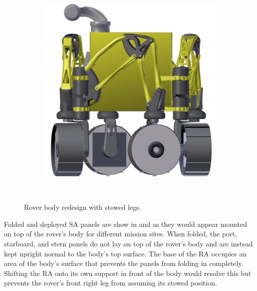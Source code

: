 \begin{figure}[h]
\begin{subfigure}[t]{\subfigureWidth}
        \includegraphics[height=\graphicsHeight]{sections/power-system-design/solar-array/images/stowed-body-box.png}
		\label{fig:sub:rover-body-redesign-stowed-legs-after}
	\end{subfigure}\\[0.8ex]
    \caption[Rover body redesign with stowed legs]
            {Rover body redesign with stowed legs.}
    \label{fig:rover-body-redesign-stowed-legs}
\vspace{-2ex}
\end{figure}


Folded and deployed \ac{SA} panels are show in  and  as they would appear mounted on top of the rover's body for different mission sites. When folded, the port, starboard, and stern panels do not lay on top of the rover's body and are instead kept upright normal to the body's top surface. The base of the \ac{RA} occupies an area of the body's surface that prevents the panels from folding in completely. Shifting the \ac{RA} onto its own support in front of the body would resolve this but prevents the rover's front right leg from assuming its stowed position.

\vspace{0.5cm}

